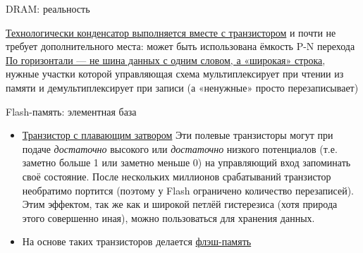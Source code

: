 \documentclass[xetex,aspectratio=43]{beamer}
\begin{document}
\begin{frame}{DRAM: реальность}
    \begin{outline}[itemize]
        \1  \href{https://en.wikipedia.org/wiki/Dynamic_random-access_memory\#History}{Технологически конденсатор выполняется вместе с транзистором} и почти не
        требует дополнительного места: может быть использована ёмкость P-N
        перехода
        \pause
        \1 \href{https://en.wikipedia.org/wiki/Dynamic_random-access_memory\#To_write_to_memory}{По горизонтали --- не шина данных с одним словом, а «широкая» строка}, нужные участки которой управляющая схема мультиплексирует при чтении из памяти и демультиплексирует при записи (а «ненужные» просто перезаписывает)
    \end{outline}
\end{frame}

\begin{frame}{Flash-память: элементная база}
    \begin{itemize}
        \item
        \href{http://en.wikipedia.org/wiki/Floating-gate_transistor}{Транзистор
            с плавающим затвором} Эти полевые транзисторы могут при подаче
        \emph{достаточно} высокого или \emph{достаточно} низкого потенциалов
        (т.е. заметно больше 1 или заметно меньше 0) на управляющий вход
        запоминать своё состояние. После нескольких миллионов срабатываний
        транзистор необратимо портится (поэтому у Flash ограничено количество
        перезаписей). Этим эффектом, так же как и широкой петлёй гистерезиса
        (хотя природа этого совершенно иная), можно пользоваться для хранения
        данных.
        \item
        На основе таких транзисторов делается
        \href{http://en.wikipedia.org/wiki/Flash_memory}{флэш-память}
    \end{itemize}
\end{frame}
\end{document}
